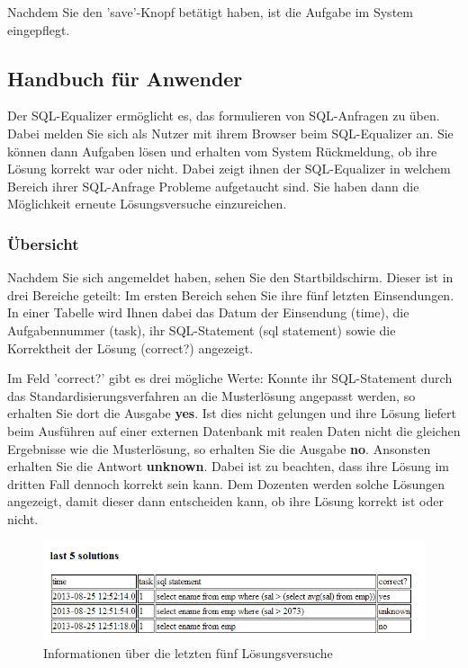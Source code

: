 \documentclass[12pt]{scrreprt}
\theoremstyle{remark}
\begin{document}
Nachdem Sie den 'save'-Knopf betätigt haben, ist die Aufgabe im System eingepflegt.


\subsection{Handbuch für Anwender}

Der SQL-Equalizer ermöglicht es, das formulieren von SQL-Anfragen zu üben. Dabei melden Sie sich als Nutzer mit ihrem Browser beim SQL-Equalizer an. Sie können dann Aufgaben lösen und erhalten vom System Rückmeldung, ob ihre Lösung korrekt war oder nicht. Dabei zeigt ihnen der SQL-Equalizer in welchem Bereich ihrer SQL-Anfrage Probleme aufgetaucht sind. Sie haben dann die Möglichkeit erneute Lösungsversuche einzureichen. 

\subsubsection{Übersicht}

Nachdem Sie sich angemeldet haben, sehen Sie den Startbildschirm. Dieser ist in drei Bereiche geteilt: Im ersten Bereich sehen Sie ihre fünf letzten Einsendungen. In einer Tabelle wird Ihnen dabei das Datum der Einsendung (time), die Aufgabennummer (task), ihr SQL-Statement (sql statement) sowie die Korrektheit der Lösung (correct?) angezeigt.

Im Feld 'correct?' gibt es drei mögliche Werte: Konnte ihr SQL-Statement durch das Standardisierungsverfahren an die Musterlösung angepasst werden, so erhalten Sie dort die Ausgabe \textbf{yes}. Ist dies nicht gelungen und ihre Lösung liefert beim Ausführen auf einer externen Datenbank mit realen Daten nicht die gleichen Ergebnisse wie die Musterlösung, so erhalten Sie die Ausgabe \textbf{no}. Ansonsten erhalten Sie die Antwort \textbf{unknown}. Dabei ist zu beachten, dass ihre Lösung im dritten Fall dennoch korrekt sein kann. Dem Dozenten werden solche Lösungen angezeigt, damit dieser dann entscheiden kann, ob ihre Lösung korrekt ist oder nicht.

\begin{figure}[H]
\centering
\includegraphics[scale=0.7]{Bilder/screen_user_1.png}
\caption{Informationen über die letzten fünf Lösungsversuche}
\end{figure}
\end{document}
